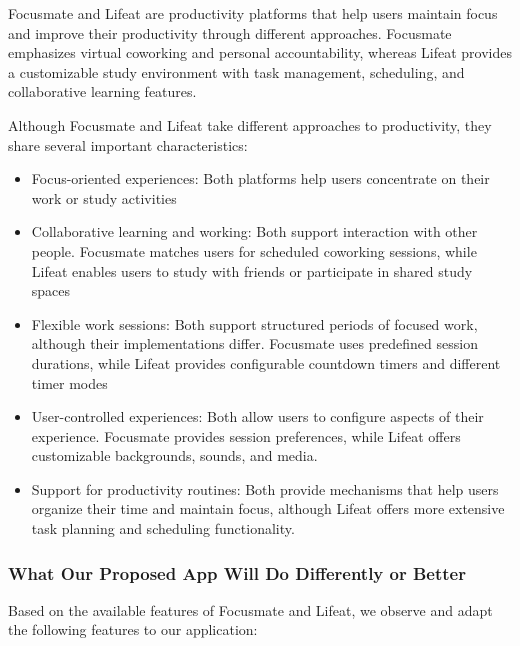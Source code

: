 \documentclass[12pt]{article}
\begin{document}
Focusmate and Lifeat are productivity platforms that help users maintain focus and improve their productivity through different approaches. Focusmate emphasizes virtual coworking and personal accountability, whereas Lifeat provides a customizable study environment with task management, scheduling, and collaborative learning features.

Although Focusmate and Lifeat take different approaches to productivity, they share several important characteristics:

\begin{itemize}
    \item Focus-oriented experiences: Both platforms help users concentrate on their work or study activities
    \item Collaborative learning and working: Both support interaction with other people. Focusmate matches users for scheduled coworking sessions, while Lifeat enables users to study with friends or participate in shared study spaces
    \item Flexible work sessions: Both support structured periods of focused work, although their implementations differ. Focusmate uses predefined session durations, while Lifeat provides configurable countdown timers and different timer modes
    \item User-controlled experiences: Both allow users to configure aspects of their experience. Focusmate provides session preferences, while Lifeat offers customizable backgrounds, sounds, and media.
    \item Support for productivity routines: Both provide mechanisms that help users organize their time and maintain focus, although Lifeat offers more extensive task planning and scheduling functionality.
\end{itemize}

\subsubsection{What Our Proposed App Will Do Differently or Better}

Based on the available features of Focusmate and Lifeat, we observe and adapt the following features to our application:
\end{document}
